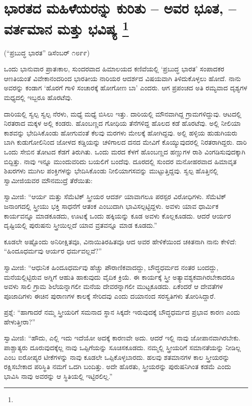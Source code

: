 
\chapter[ಭಾರತದ ಮಹಿಳೆಯರನ್ನು ಕುರಿತು – ಅವರ ಭೂತ, – ವರ್ತಮಾನ ಮತ್ತು ಭವಿಷ್ಯ ]{ಭಾರತದ ಮಹಿಳೆಯರನ್ನು ಕುರಿತು – ಅವರ ಭೂತ, – ವರ್ತಮಾನ ಮತ್ತು ಭವಿಷ್ಯ \protect\footnote{}}

\centerline{(“ಪ್ರಬುದ್ಧ ಭಾರತ” ಡಿಸೆಂಬರ್​ ೧೮೯೯)}

ಒಂದು ಭಾನುವಾರ ಪ್ರಾತಃಕಾಲ, ಸುಂದರವಾದ ಹಿಮಾಲಯದ ಕಣಿವೆಯಲ್ಲಿ ‘ಪ್ರಬುದ್ಧ ಭಾರತ’ ಸಂಪಾದಕರ ಆಣತಿಯಂತೆ ವಿವೇಕಾನಂದರಿಂದ ಭಾರತೀಯ ನಾರಿಯರ ಆದರ್ಶದ ವಿಷಯವಾಗಿ ತಿಳಿದುಕೊಳ್ಳಲು ಹೋದೆ. ನಾನು ಅವರನ್ನು ಕಂಡಾಗ ‘ಹೊರಗೆ ಗಾಳಿ ಸಂಚಾರಕ್ಕೆ ಹೋಗೋಣ ಬಾ’ ಎಂದರು. ಆಗ ಪ್ರಪಂಚದ ಅತಿ ರಮ್ಯವಾದ ದೃಶ್ಯಗಳ ಮಧ್ಯದಲ್ಲಿ ಇಬ್ಬರೂ ಹೊರಟೆವು.

ದಾರಿಯಲ್ಲಿ ಸ್ವಲ್ಪ ಸ್ವಲ್ಪ ನೆರಳು, ಮಧ್ಯೆ ಮಧ್ಯೆ ಬಿಸಿಲು ಇತ್ತು. ದಾರಿಯಲ್ಲಿ ಮೌನವಾಗಿದ್ದ ಗ್ರಾಮಗಳಿದ್ದುವು. ಆಟದಲ್ಲಿ ನಿರತರಾದ ಮಕ್ಕಳ ಅಲ್ಲಿ ಕಂಡರು. ಹೊಂಬಣ್ಣದ ಗೋಧಿಯ ತೆನೆಗಳಿದ್ದ ಹೊಲದ ಕಡೆ ಹೊರಟೆವು. ಅಲ್ಲಿ ನೀಲಿಯಾ ಕಾಶವನ್ನು ಭೇದಿಸಿಕೊಂಡು ಹೋಗುವಂತೆ ಕೆಲವು ಮರಗಳು ಮೇಲಕ್ಕೆ ಹೋಗಿದ್ದವು. ಅಲ್ಲಿ ಹಳ್ಳಿಯ ಹುಡುಗಿಯರು ಬಾಗಿ ಕುಡುಗೋಲಿನಿಂದ ಜೋಳದ ಕಡ್ಡಿಯನ್ನು ಚಳಿಗಾಲದ ದನದ ಮೇವಿಗೆ ಕೊಯ್ಯುವುದರಲ್ಲಿ ನಿರತರಾಗಿದ್ದರು. ದಾರಿ ಒಂದು ಸೇಬಿನ ತೋಟದ ಕೆಡಗೆ ತಿರುಗಿತು. ಒಂದು ಮರದ ಕೆಳಗೆ ಹೊಂಬಣ್ಣದ ಹಣ್ಣುಗಳ ರಾಶಿ ವಿಂಗಡಿಸುವುದಕ್ಕಾಗಿ ಬಿದ್ದಿತ್ತು. ನಾವು ಇನ್ನೂ ಮುಂದುವರಿದು ಬಯಲಿಗೆ ಬಂದೆವು. ದೂರದಲ್ಲಿ ಸುಂದರ ಮನೋಹರವಾದ ಹಿಮಾವೃತ ಶಿಖರಗಳು ಮುಗಿಲ ಪಂಕ್ತಿಗಳನ್ನು ಭೇದಿಸಿಕೊಂಡು ನೀಲಿಯಾಗಸವನ್ನು ಮುಟ್ಟುತ್ತಿದ್ದವು. ಸ್ವಲ್ಪ ಹೊತ್ತಿನಲ್ಲಿ ಸ್ವಾಮೀಜಿಯವರ ಮೌನಮುದ್ರೆ ತೆರೆಯಿತು:

ಸ್ವಾಮೀಜಿ: “ಆರ್ಯ ಮತ್ತು ಸೆಮೆಟಿಕ್​ ಸ್ತ್ರೀಯರ ಆದರ್ಶ ಯಾವಾಗಲೂ ಪರಸ್ಪರ ವಿರೋಧಿಗಳು. ಸೆಮೆಟಿಕ್​ ಜನಾಂಗದಲ್ಲಿ ಸ್ತ್ರೀಯು ಭಕ್ತಿ ಸಾಧನೆಗೆ ಆತಂಕ ಎಂಬುದಾಗಿ ಭಾವಿಸಲ್ಪಟ್ಟಿದ್ದಳು. ಅವಳು ಯಾವ ಧಾರ್ಮಿಕ ಕಾರ್ಯವನ್ನೂ ಮಾಡಕೂಡದು, ಊಟಕ್ಕೆ ಒಂದು ಹಕ್ಕಿಯನ್ನು ಕೂಡ ಅವಳು ಕೊಲ್ಲಕೂಡದು. ಆದರೆ ಆರ್ಯರ ದೃಷ್ಟಿಯಲ್ಲಿ ಪುರುಷನು ಸ್ತ್ರೀಯಿಲ್ಲದೆ ಯಾವ ವ್ರತವನ್ನೂ ಮಾಡ ಕೂಡದು.”

ಕೂಡಲೇ ಅಷ್ಟೊಂದು ಅನಿರೀಕ್ಷಿತವೂ, ವಿನಾಯಿತಿರಹಿತವೂ ಆದ ಅವರ ಹೇಳಿಕೆಯಿಂದ ಚಕಿತನಾಗಿ ನಾನು ಕೇಳಿದೆ: “ಹಿಂದೂಧರ್ಮವು ಆರ್ಯರ ಧರ್ಮವಲ್ಲವೆ?”

ಸ್ವಾಮೀಜಿ: “ಆಧುನಿಕ ಹಿಂದೂಧರ್ಮವು ಹೆಚ್ಚು ಪೌರಾಣಿಕವಾದದ್ದು, ಬೌದ್ಧಧರ್ಮದ ನಂತರ ಬಂದದ್ದು, ಮನೆಯಲ್ಲಿಟ್ಟಿರುವ ಅಗ್ನಿಗೆ ಆಹುತಿ ಹಾಕುವುದು ವೈದಿಕ ಕ್ರಿಯೆ. ಈ ಕಾರ್ಯಕ್ಕೆ ಸ್ತ್ರೀ ಅತ್ಯಾವಶ್ಯಕವಾಗಿರಬೇಕಾದರೂ ಅವಳು ಸಾಲಿ ಗ್ರಾಮ ಶಿಲೆಯನ್ನಾಗಲೀ ಮನೆಯ ದೇವರನ್ನಾಗಲೀ ಮುಟ್ಟಕೂಡದು. ಏಕೆಂದರೆ ಆ ದೇವತೆಗಳ ಪೂಜಾದಿಗಳು ಈಚಿನ ಪುರಾಣಗಳ ಕಾಲಕ್ಕೆ ಸೇರಿದವು ಎಂದು ದಯಾನಂದ ಸರಸ್ವತಿಗಳು ತೋರಿಸಿದ್ದಾರೆ.

ಪ್ರಶ್ನೆ: “ಹಾಗಾದರೆ ನಮ್ಮ ಸ್ತ್ರೀಯರಿಗೆ ಸಮನಾದ ಸ್ಥಾನ ಸಿಕ್ಕದೇ ಇರುವುದಕ್ಕೆ ಬೌದ್ಧಧರ್ಮದ ಪ್ರಭಾವ ಕಾರಣ ಎಂದು ಹೇಳುತ್ತೀರಾ?”

ಸ್ವಾಮೀಜಿ: “ಹೌದು, ಎಲ್ಲಿ ಇದು ಇದೆಯೋ ಅದಕ್ಕೆ ಕಾರಣವೇ ಅದು. ಆದರೆ ಇಲ್ಲಿ ನಾವು ಜೋಪಾನವಾಗಿರಬೇಕು. ಪಾಶ್ಚಾತ್ಯರು ದೂರುವುದಕ್ಕೆಲ್ಲ ನಾವು ಒಪ್ಪಿಗೆಯನ್ನು ಸೂಚಿಸಕೂಡದು. ನಮ್ಮಲ್ಲಿ ಸ್ತ್ರೀಯರಿಗೆ ಸಮಾನತೆಯನ್ನು ನೀಡಿಲ್ಲ ಎಂಬ ಐರೋಪ್ಯರ ಟೀಕೆಗಳನ್ನು ನಾವು ಕೂಡಲೇ ಒಪ್ಪಿಕೊಳ್ಳಬಾರದು. ಹಲವು ಶತಮಾನಗಳ ಕಾಲ ಸ್ತ್ರೀಯರನ್ನು ರಕ್ಷಿಸಬೇಕಾದ ಪರಿಸ್ಥಿತಿ ನಮಗೆ ಒದಗಿ ಬಂದಿತ್ತು. ಅದೇ ಹೊರತು, ಸ್ತ್ರೀಯರನ್ನು ಪುರುಷನಿಗಿಂತ ಕಡಮೆ ಎಂದು ಭಾವಿಸಿ ನಾವು ಅವರನ್ನು ಆ ಸ್ಥಿತಿಯಲ್ಲಿ ಇಟ್ಟಿರಲಿಲ್ಲ.”

